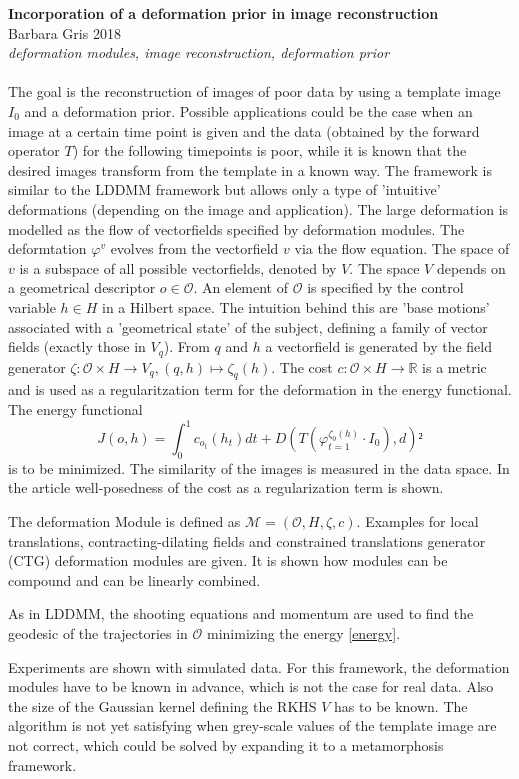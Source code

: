 \documentclass[twoside]{article}
\newcommand{\lit}[5]{%
        \textbf{\Large{#1}} \\%
        \large{#2 #3} \\%
        \textit{#4} \\%
        \vspace{0.05cm}\\%
        #5\\%
        \vspace{0.5cm}
    }
\newcommand{\R}{\mathbb{R}}
\newcommand{\Ocal}{\mathcal{O}}
\newcommand{\Mcal}{\mathcal{M}}
\begin{document}
	
\lit{Incorporation of a deformation prior in image reconstruction}{Barbara Gris}{2018}
{deformation modules, image reconstruction, deformation prior}
{The goal is the reconstruction of images of poor data by using a template image $I_0$ and a deformation prior. Possible applications could be the case when an image at a certain time point is given and the data (obtained by the forward operator $T$) for the following timepoints is poor, while it is known that the desired images transform from the template in a known way.
	The framework is similar to the LDDMM framework but allows only a type of 'intuitive' deformations (depending on the image and application).	
	The large deformation is modelled as the flow of vectorfields specified by deformation modules. The deformtation $\varphi^v$ evolves from the vectorfield $v$ via the flow equation. The space of $v$ is a subspace of all possible vectorfields, denoted by $V$.
	The space $V$ depends on a geometrical descriptor $o\in\Ocal$. An element of $\Ocal$ is specified by the control variable $h\in H$ in a Hilbert space.
	The intuition behind this are 'base motions' associated with a 'geometrical state' of the subject, defining a family of vector fields (exactly those in $V_q$).
	From $q$ and $h$ a vectorfield is generated by the field generator $\zeta\colon \Ocal\times H \longrightarrow V_q, (q,h)\mapsto \zeta_q(h)$.
	The cost $c\colon \Ocal\times H\rightarrow \R$ is a metric and is used as a regularitzation term for the deformation in the energy functional.
	The energy functional 
	\begin{equation}
	J (o,h) = \int_{0}^{1} c_{o_t}(h_t) dt + D( T(\varphi^{\zeta_0(h)}_{t=1}\cdot I_0),d)²
	\label{energy}
	\end{equation}
	is to be minimized. The similarity of the images is measured in the data space.
	In the article well-posedness of the cost as a regularization term is shown.
	
	The deformation Module is defined as $\Mcal = (\Ocal, H, \zeta, c)$. Examples for local translations, contracting-dilating fields and constrained translations generator (CTG) deformation modules are given. It is shown how modules can be compound and can be linearly combined.
	
	As in LDDMM, the shooting equations and momentum are used to find the geodesic of the trajectories in $\Ocal$ minimizing the energy \eqref{energy}.
	
	Experiments are shown with simulated data.
	For this framework, the deformation modules have to be known in advance, which is not the case for real data. Also the size of the Gaussian kernel defining the RKHS $V$ has to be known. 
	The algorithm is not yet satisfying when grey-scale values of the template image are not correct, which could be solved by expanding it to a metamorphosis framework.}
\end{document}
